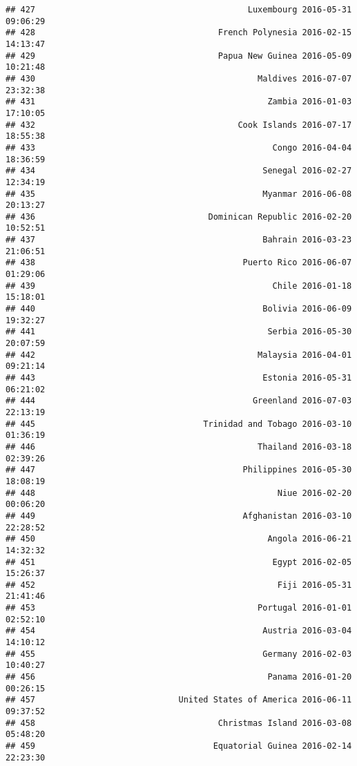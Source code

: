 \documentclass[
]{article}
\begin{document}
\begin{verbatim}
## 427                                           Luxembourg 2016-05-31 09:06:29
## 428                                     French Polynesia 2016-02-15 14:13:47
## 429                                     Papua New Guinea 2016-05-09 10:21:48
## 430                                             Maldives 2016-07-07 23:32:38
## 431                                               Zambia 2016-01-03 17:10:05
## 432                                         Cook Islands 2016-07-17 18:55:38
## 433                                                Congo 2016-04-04 18:36:59
## 434                                              Senegal 2016-02-27 12:34:19
## 435                                              Myanmar 2016-06-08 20:13:27
## 436                                   Dominican Republic 2016-02-20 10:52:51
## 437                                              Bahrain 2016-03-23 21:06:51
## 438                                          Puerto Rico 2016-06-07 01:29:06
## 439                                                Chile 2016-01-18 15:18:01
## 440                                              Bolivia 2016-06-09 19:32:27
## 441                                               Serbia 2016-05-30 20:07:59
## 442                                             Malaysia 2016-04-01 09:21:14
## 443                                              Estonia 2016-05-31 06:21:02
## 444                                            Greenland 2016-07-03 22:13:19
## 445                                  Trinidad and Tobago 2016-03-10 01:36:19
## 446                                             Thailand 2016-03-18 02:39:26
## 447                                          Philippines 2016-05-30 18:08:19
## 448                                                 Niue 2016-02-20 00:06:20
## 449                                          Afghanistan 2016-03-10 22:28:52
## 450                                               Angola 2016-06-21 14:32:32
## 451                                                Egypt 2016-02-05 15:26:37
## 452                                                 Fiji 2016-05-31 21:41:46
## 453                                             Portugal 2016-01-01 02:52:10
## 454                                              Austria 2016-03-04 14:10:12
## 455                                              Germany 2016-02-03 10:40:27
## 456                                               Panama 2016-01-20 00:26:15
## 457                             United States of America 2016-06-11 09:37:52
## 458                                     Christmas Island 2016-03-08 05:48:20
## 459                                    Equatorial Guinea 2016-02-14 22:23:30

\end{verbatim}
\end{document}
